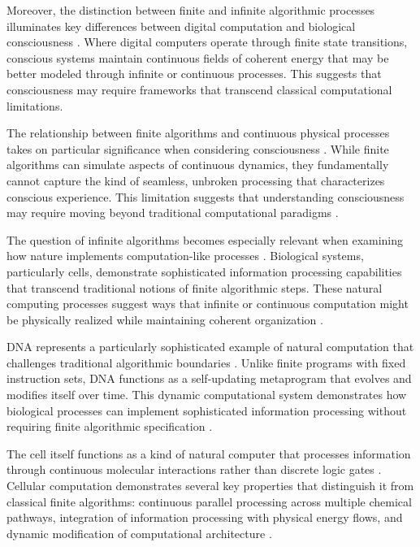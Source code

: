 Moreover, the distinction between finite and infinite algorithmic processes illuminates key differences between digital computation and biological consciousness \cite{Kozen2006}. Where digital computers operate through finite state transitions, conscious systems maintain continuous fields of coherent energy that may be better modeled through infinite or continuous processes. This suggests that consciousness may require frameworks that transcend classical computational limitations.

The relationship between finite algorithms and continuous physical processes takes on particular significance when considering consciousness \cite{PourEl1989}. While finite algorithms can simulate aspects of continuous dynamics, they fundamentally cannot capture the kind of seamless, unbroken processing that characterizes conscious experience. This limitation suggests that understanding consciousness may require moving beyond traditional computational paradigms \cite{Sipser2012}.

The question of infinite algorithms becomes especially relevant when examining how nature implements computation-like processes \cite{Soare2016}. Biological systems, particularly cells, demonstrate sophisticated information processing capabilities that transcend traditional notions of finite algorithmic steps. These natural computing processes suggest ways that infinite or continuous computation might be physically realized while maintaining coherent organization \cite{vanLeeuwen2012}.

DNA represents a particularly sophisticated example of natural computation that challenges traditional algorithmic boundaries \cite{Wegner2003}. Unlike finite programs with fixed instruction sets, DNA functions as a self-updating metaprogram that evolves and modifies itself over time. This dynamic computational system demonstrates how biological processes can implement sophisticated information processing without requiring finite algorithmic specification \cite{Deutsch2011}.

The cell itself functions as a kind of natural computer that processes information through continuous molecular interactions rather than discrete logic gates \cite{Rovelli2018}. Cellular computation demonstrates several key properties that distinguish it from classical finite algorithms: continuous parallel processing across multiple chemical pathways, integration of information processing with physical energy flows, and dynamic modification of computational architecture \cite{Aaronson2013}.

